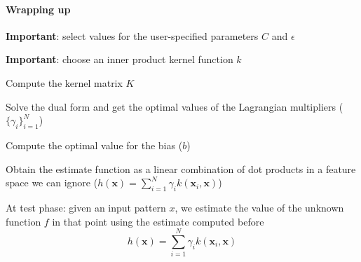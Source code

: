 \documentclass[10pt]{report}
\begin{document}
\paragraph{Wrapping up}
\begin{list}{}{}
	\item \textbf{Important}: select values for the user-specified parameters $C$ and $\epsilon$
	\item \textbf{Important}: choose an inner product kernel function $k$
	\item Compute the kernel matrix $K$
	\item Solve the dual form and get the optimal values of the Lagrangian multipliers ($\{\gamma_i\}_{i=1}^N$)
	\item Compute the optimal value for the bias ($b$)
	\item Obtain the estimate function as a linear combination of dot products in a feature space we can ignore ($h(\mathbf{x}) = \sum_{i=1}^N \gamma_ik(\mathbf{x}_i, \mathbf{x})$)
\end{list}
At test phase: given an input pattern $x$, we estimate the value of the unknown function $f$ in that point using the estimate computed before $$h(\mathbf{x}) = \sum_{i=1}^N\gamma_i k(\mathbf{x}_i,\mathbf{x})$$
\end{document}
